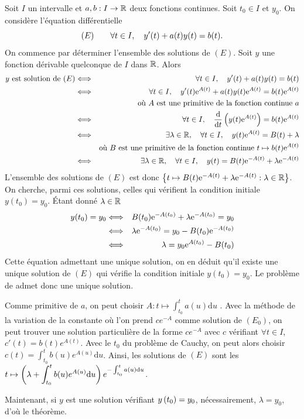 \documentclass{magnolia}
\begin{document}
\begin{preuve}
\begin{francois}
Soit $I$ un intervalle et $a,b:I\to\mathbb{R}$ deux fonctions continues. Soit $t_0\in I$ et $y_0$. On considère l'équation différentielle
\[(E)\qquad\forall t\in I,\quad y'(t)+a(t)y(t)=b(t).\]
On commence par déterminer l'ensemble des solutions de $(E)$. Soit $y$ une fonction dérivable quelconque de $I$ dans $\mathbb{R}$. Alors
\begin{eqnarray*}
\text{$y$ est solution de $(E)$}
&\Longleftrightarrow& \forall t\in I,\quad y'(t)+a(t)y(t)=b(t)\\
&\Longleftrightarrow& \forall t\in I,\quad y'(t){\rm e}^{A(t)}+a(t)y(t){\rm e}^{A(t)}=b(t){\rm e}^{A(t)}\\
&    & \text{où $A$ est une primitive de la fonction continue $a$}\\
&\Longleftrightarrow& \forall t\in I,\quad \frac{{\rm d}}{{\rm d}t}\left(y(t){\rm e}^{A(t)}\right)=b(t){\rm e}^{A(t)}\\
&\Longleftrightarrow& \exists\lambda\in\mathbb{R},\quad \forall t\in I,\quad y(t){\rm e}^{A(t)}=B(t)+\lambda\\
&    & \text{où $B$ est une primitive de la fonction continue $t\mapsto b(t){\rm e}^{A(t)}$}\\
&\Longleftrightarrow& \exists\lambda\in\mathbb{R},\quad \forall t\in I,\quad y(t)=B(t){\rm e}^{-A(t)}+\lambda{\rm e}^{-A(t)}
\end{eqnarray*}
L'ensemble des solutions de $(E)$ est donc $\left\{t\mapsto B(t){\rm e}^{-A(t)}+\lambda{\rm e}^{-A(t)} : \lambda\in\mathbb{R}\right\}$. On cherche, parmi ces solutions, celles qui vérifient la condition initiale $y(t_0)=y_0$. Étant donné $\lambda\in\mathbb{R}$
\begin{eqnarray*}
y(t_0)=y_0
&\Longleftrightarrow& B(t_0){\rm e}^{-A(t_0)}+\lambda{\rm e}^{-A(t_0)}=y_0\\
&\Longleftrightarrow& \lambda{\rm e}^{-A(t_0)}=y_0-B(t_0){\rm e}^{-A(t_0)}\\
&\Longleftrightarrow& \lambda=y_0{\rm e}^{A(t_0)}-B(t_0)
\end{eqnarray*}
Cette équation admettant une unique solution, on en déduit qu'il existe une unique solution de $(E)$ qui vérifie la condition initiale $y(t_0)=y_0$. Le problème de  admet donc une unique solution.
\end{francois}
\begin{victor}
Comme primitive de $a$, on peut choisir $A:t\mapsto \displaystyle \int_{t_0}^t a(u)\mathrm{d}u$ . Avec la méthode de la variation de la constante où l'on prend $ce^{-A}$ comme solution de $(E_0)$, on peut trouver une solution particulière de la forme $ce^{-A}$ avec $c$ vérifiant $\forall t \in I$, $c'(t)=b(t)e^{A(t)}$. Avec le $t_0$ du problème de Cauchy, on peut alors choisir $c(t)=\displaystyle \int_{t_0}^t b(u)e^{A(u)} \mathrm{d} u$. Ainsi, les solutions de $(E)$ sont les $t\mapsto \left(\lambda+\displaystyle \int_{t_0}^t b(u)e^{A(u)} \mathrm{d} u\right)e^{-\int_{t_0}^t a(u)\mathrm{d}u}$.

Maintenant, si $y$ est une solution vérifiant $y\left(t_0\right)=y_0$, nécessairement, $\lambda=y_0$, d'où le théorème.
\end{victor}
\end{preuve}
\end{document}
